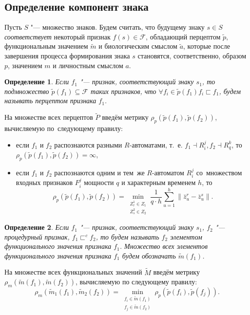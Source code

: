 \documentclass[a4paper, 12pt]{article}
\theoremstyle{plain}
\newtheorem{Def}{Определение}
\begin{document}
	\subsection{Определение компонент знака}
	Пусть $S$ "--- множество знаков. Будем считать, что будущему знаку $s\in S$ \textit{соответствует} некоторый признак $f(s)\in\mathcal F$, обладающий перцептом $\tilde p$, функциональным значением $\tilde m$ и биологическим смыслом $\tilde a$, которые после завершения процесса формирования знака $s$ становятся, соответственно, образом $p$, значением $m$ и личностным смыслом $a$.
	
	\begin{Def}
		Если $f_1$ "--- признак, соответствующий знаку $s_1$, то подмножество $\tilde p(f_1)\subseteq\mathcal F$ таких признаков, что $\forall f_i\in\tilde p(f_1) f_i\sqsubset f_1$, будем называть перцептом признака $f_1$.
	\end{Def}
	
	На множестве всех перцептов $\tilde P$ введём метрику $\rho_p(\tilde p(f_1),\tilde p(f_2))$, вычисляемую по~следующему правилу:
	\begin{itemize}
		\item если $f_1$ и $f_2$ распознаются разными $R$-автоматами, т.~е. $f_1\dashv R_i^j, f_2\dashv R_q^k$, то $\rho_p(\tilde p(f_1),\tilde p(f_2))=\infty$,
		\item если $f_1$ и $f_2$ распознаются одним и тем~же $R$-автоматом $R_i^j$ со~множеством входных признаков $F_i^j$ мощности $q$ и характерным временем $h$, то
		\begin{equation}
			\rho_p(\tilde p(f_1),\tilde p(f_2))=\min\limits_{\substack{Z_r^1\in Z_1\\Z_s^2\in Z_2}}\frac{1}{q\cdot h}\sum\limits_{u=1}^h\|\bar z_u^r-\bar z_u^s\|.
		\end{equation} 
	\end{itemize}
	
	\begin{Def}
		Если $f_1$ "--- признак, соответствующий знаку $s_1$, $f_2$ "--- процедурный признак, $f_1\sqsubset^c f_2$, то будем называть $f_2$ элементом функционального значения признака $f_1$. Множество всех элементов функционального значения признака $f_1$ будем обозначать $\tilde m(f_1)$.
	\end{Def}
	
	На множестве всех функциональных значений $\tilde M$ введём метрику $\rho_m(\tilde m(f_1),\tilde m(f_2))$, вычисляемую по следующему правилу:
	\begin{equation}\label{eq:m_metr}
		\rho_m(\tilde m_1(f_1),\tilde m_2(f_2 ))=\min\limits_{\substack{f_i\in\tilde m(f_1 )\\f_j\in\tilde m(f_2 )}}\rho_p(\tilde p(f_i ),\tilde p(f_j )).
	\end{equation}
		
\end{document}

